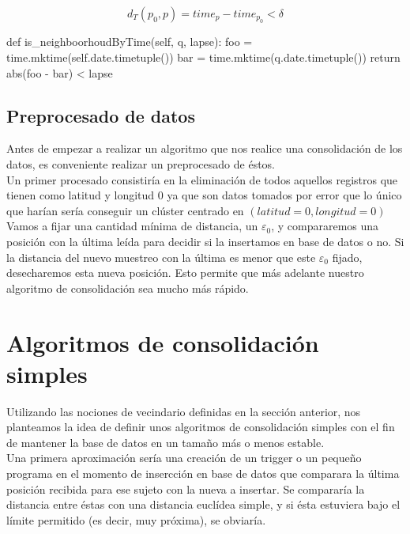 \documentclass[a4paper, 12pt]{article}
\begin{document}
$$ d_T(p_0, p) = time_p - time_{p_0} < \delta $$

\begin{python}
	def is_neighboorhoudByTime(self, q, lapse):
		foo = time.mktime(self.date.timetuple())
		bar = time.mktime(q.date.timetuple())
		return abs(foo - bar) < lapse
\end{python}


\pagebreak
\subsection{Preprocesado de datos}
Antes de empezar a realizar un algoritmo que nos realice una consolidaci\'on de los datos, es conveniente realizar un preprocesado de \'estos. \\

Un primer procesado consistir\'ia en la eliminaci\'on de todos aquellos registros que tienen como latitud y longitud $0$ ya que son datos tomados por error que lo \'unico que har\'ian ser\'ia conseguir un cl\'uster centrado en $(latitud = 0, longitud = 0)$ \\

Vamos a fijar una cantidad m\'inima de distancia, un $\varepsilon_0$, y compararemos una posici\'on con la \'ultima le\'ida para decidir si la insertamos en base de datos o no. Si la distancia del nuevo muestreo con la \'ultima es menor que este $\varepsilon_0$ fijado, desecharemos esta nueva posici\'on. Esto permite que m\'as adelante nuestro algoritmo de consolidaci\'on sea mucho m\'as r\'apido. \\


\pagebreak
\section{Algoritmos de consolidaci\'on simples}

Utilizando las nociones de vecindario definidas en la secci\'on anterior, nos planteamos la idea de definir unos algoritmos de consolidaci\'on simples con el fin de mantener la base de datos en un tama\~no m\'as o menos estable. \\

Una primera aproximaci\'on ser\'ia una creaci\'on de un trigger o un peque\~no programa en el momento de insercci\'on en base de datos que comparara la \'ultima posici\'on recibida para ese sujeto con la nueva a insertar. Se comparar\'ia la distancia entre \'estas con una distancia eucl\'idea simple, y si \'esta estuviera bajo el l\'imite permitido (es decir, muy pr\'oxima), se obviar\'ia. \\
\end{document}
